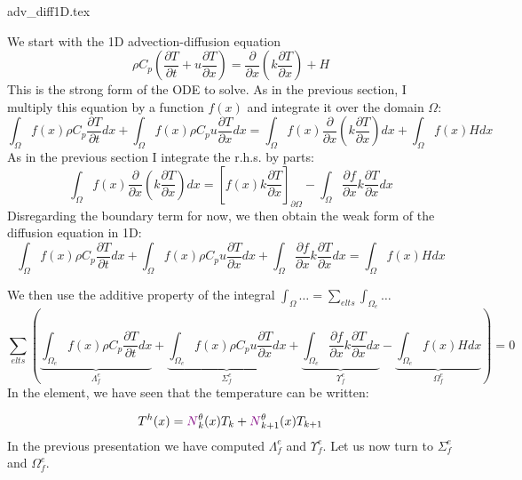 \begin{flushright} {\tiny {\color{gray} adv\_diff1D.tex}} \end{flushright}

We start with the 1D advection-diffusion equation
\begin{equation}
\rho C_p \left( \frac{\partial T}{\partial t} 
+ u \frac{\partial T}{\partial x}
\right)
= \frac{\partial }{\partial x} \left( k \frac{\partial T}{\partial x}  \right)
+H
\end{equation}
This is the {\color{olive}strong form} of the ODE to solve.
As in the previous section, I multiply this equation by a function $f(x)$ and integrate it over 
the domain $\Omega$:
\[
\int_{\Omega} f(x)  \rho C_p\frac{\partial T}{\partial t} dx
+
\int_{\Omega} f(x)  \rho C_p u \frac{\partial T}{\partial x} dx
\!=\!
\int_{\Omega} f(x) \frac{\partial }{\partial x}\! \left(\! k\! \frac{\partial T}{\partial x}\!  \right)\! dx
+
\int_{\Omega} f(x) H dx 
\]
As in the previous section I integrate the r.h.s. by parts:
\[
\int_{\Omega} f(x) \frac{\partial }{\partial x} \left( k \frac{\partial T}{\partial x}  \right) dx
=
\left[
f(x) k \frac{\partial T}{\partial x}
\right]_{\partial \Omega}
-
\int_{\Omega} \frac{\partial f}{\partial x}  k \frac{\partial T}{\partial x}  dx
\]
Disregarding the boundary term for now, 
we then obtain the {\color{olive}weak form} of the diffusion equation in 1D:
\[
\boxed{
\int_{\Omega} f(x) \rho C_p \frac{\partial T}{\partial t} dx
+
\int_{\Omega} f(x)  \rho C_p u \frac{\partial T}{\partial x} dx
+
\int_{\Omega} \frac{\partial f}{\partial x}  k \frac{\partial T}{\partial x}  dx = 
\int_{\Omega} f(x) H dx 
}
\]

We then use the additive property of the integral $\int_\Omega \dots = \sum_{elts} \int_{\Omega_e} \dots$
\[
\sum_{elts} \left(     
\underbrace{ \int_{\Omega_e} f(x) \rho C_p   \frac{\partial T}{\partial t} dx }_{{\Lambda}_f^e}
+
\underbrace{  \int_{\Omega_e} f(x)  \rho C_p u \frac{\partial T}{\partial x} dx  }_{{\Sigma}_f^e}
+
\underbrace{\int_{\Omega_e} \frac{\partial f}{\partial x}  k \frac{\partial T}{\partial x}  dx}_{{\Upsilon}_f^e}    
- 
\underbrace{\int_{\Omega_e} f(x) H dx }_{{\Omega}_f^e}
  \right) = 0  
\]
In the element, we have seen that the temperature can be written:

\[
T^h(x) 
= {\color{violet}N}^\theta_{k}(x) T_k + {\color{violet}N}^\theta_{k+1}(x) T_{k+1}  
\]
In the previous presentation we have computed  ${\Lambda}_f^e$ and ${\Upsilon}_f^e$.
Let us now turn to ${\Sigma}_f^e$ and ${\Omega}_f^e$.

